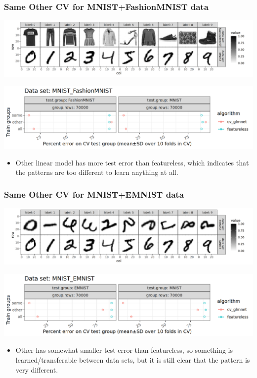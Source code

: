 \documentclass{beamer}
\begin{document}
\begin{frame}
  \frametitle{Same Other CV for MNIST+FashionMNIST data}

  \includegraphics[width=\textwidth]{data_Classif_MNIST_other_FashionMNIST.png}
  
  \includegraphics[width=\textwidth]{MNIST_FashionMNIST_error_glmnet_featureless_mean_SD.png}
  \begin{itemize}
  \item Other linear model has more test error than featureless, which
    indicates that the patterns are too different to learn anything at
    all.
  \end{itemize}
\end{frame}

\begin{frame}
  \frametitle{Same Other CV for MNIST+EMNIST data}

  \includegraphics[width=\textwidth]{data_Classif_MNIST_other_EMNIST.png}
  
  \includegraphics[width=\textwidth]{MNIST_EMNIST_error_glmnet_featureless_mean_SD.png}
  \begin{itemize}
  \item Other has somewhat smaller test error than featureless, so
    something is learned/transferable between data sets, but it is
    still clear that the pattern is very different.
  \end{itemize}
\end{frame}
\end{document}
